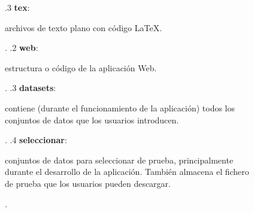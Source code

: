 \begin{figure}[H]
{        .3 \textbf{tex}: \begin{minipage}[t]{8cm}
            archivos de texto plano con código \LaTeX{.}\\
        \end{minipage}.
        .2 \textbf{web}: \begin{minipage}[t]{8cm}
            estructura o código de la aplicación Web{.}\\
        \end{minipage}.
        .3 \textbf{datasets}: \begin{minipage}[t]{8cm}
            contiene (durante el funcionamiento de la aplicación) todos los conjuntos de
            datos que los usuarios introducen{.}\\
        \end{minipage}.
        .4 \textbf{seleccionar}: \begin{minipage}[t]{8cm}
            conjuntos de datos para seleccionar de prueba, principalmente
            durante el desarrollo de la aplicación{.} También almacena el fichero de
            prueba que los usuarios pueden descargar{.}\\
        \end{minipage}.
    }
\end{figure}

\begin{figure}[H]
\end{figure}


